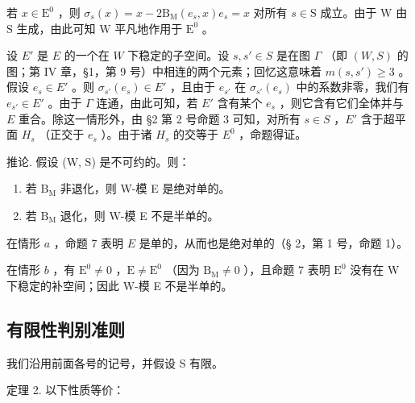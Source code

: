 若 \(x \in \mathrm{E}^0\) ，则 \(\sigma_s(x) = x - 2\mathrm{B}_{\mathrm{M}}(e_s, x)e_s = x\) 对所有 \(s \in \mathrm{S}\) 成立。由于 \(\mathrm{W}\) 由 \(\mathrm{S}\) 生成，由此可知 \(\mathrm{W}\) 平凡地作用于 \(\mathrm{E}^0\) 。

设 \(E'\) 是 \(E\) 的一个在 \(W\) 下稳定的子空间。设 \(s, s' \in S\) 是在图 \(\Gamma\) （即 \((W, S)\) 的图；第 IV 章，§1，第 9 号）中相连的两个元素；回忆这意味着 \(m(s, s') \geqslant 3\) 。假设 \(e_s \in E'\) 。则 \(\sigma_{s'}(e_s) \in E'\) ，且由于 \(e_{s'}\) 在 \(\sigma_{s'}(e_s)\) 中的系数非零，我们有 \(e_{s'} \in E'\) 。由于 \(\Gamma\) 连通，由此可知，若 \(E'\) 含有某个 \(e_s\) ，则它含有它们全体并与 \(E\) 重合。除这一情形外，由 §2 第 2 号命题 3 可知，对所有 \(s \in S\) ，\(E'\) 含于超平面 \(H_s\) （正交于 \(e_s\) ）。由于诸 \(H_s\) 的交等于 \(E^0\) ，命题得证。

推论. 假设 (W, S) 是不可约的。则：

\begin{enumerate}
\def\labelenumi{\alph{enumi})}
\item
  若 \(\mathrm{B_M}\) 非退化，则 W-模 E 是绝对单的。
\item
  若 \(\mathrm{B_M}\) 退化，则 W-模 E 不是半单的。
\end{enumerate}

在情形 \(a\) ，命题 7 表明 \(E\) 是单的，从而也是绝对单的（§ 2，第 1 号，命题 1）。

在情形 \(b\) ，有 \(\mathrm{E}^0 \neq 0\) ，\(\mathrm{E} \neq \mathrm{E}^0\) （因为 \(\mathrm{B}_{\mathrm{M}} \neq 0\) ），且命题 7 表明 \(\mathrm{E}^0\) 没有在 W 下稳定的补空间；因此 W-模 E 不是半单的。

\subsection{有限性判别准则}

我们沿用前面各号的记号，并假设 S 有限。

定理 2. 以下性质等价：

